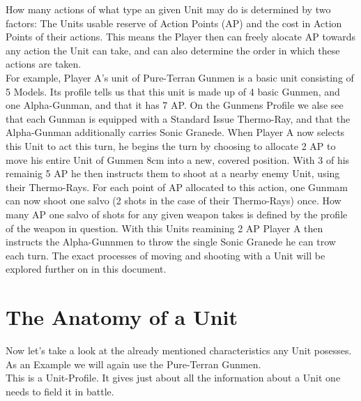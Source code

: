 \documentclass[a4paper,14pt]{book}
\begin{document}
How many actions of what type an given Unit may do is determined by two factors: The Units usable reserve of Action Points (AP) and the cost in Action Points of their actions. This means the Player then can freely alocate AP towards any action the Unit can take, and can also determine the order in which these actions are taken.\\
 For example, Player A's unit of Pure-Terran Gunmen is a basic unit consisting of 5 Models. Its profile tells us that this unit is made up of  4 basic Gunmen, and one Alpha-Gunman, and that it has 7 AP. On the Gunmens Profile we alse see that each Gunman is equipped with a Standard Issue Thermo-Ray, and that the Alpha-Gunman additionally carries Sonic Granede. When Player A now selects this Unit to act this turn, he begins the turn by choosing to allocate 2 AP to move his entire Unit of Gunmen 8cm into a new, covered position. With 3 of his remainig 5 AP he then instructs them to shoot at a nearby enemy Unit, using their Thermo-Rays. For each point of AP allocated to this action, one Gunmam can now shoot one salvo (2 shots in the case of their Thermo-Rays) once. How many AP one salvo of shots for any given weapon takes is defined by the profile of the weapon in question. With this Units reamining 2 AP Player A then instructs the Alpha-Gunnmen to throw the single Sonic Granede he can trow each turn. The exact processes of moving and shooting with a Unit will be explored further on in this document.\\
 \newpage
 \section{The Anatomy of a Unit}
 Now let's take a look at the already mentioned characteristics any Unit posesses. As an Example we will again use the Pure-Terran Gunmen.\\
 This is a Unit-Profile. It gives just about all the information about a Unit one needs to field it in battle.
\end{document}
